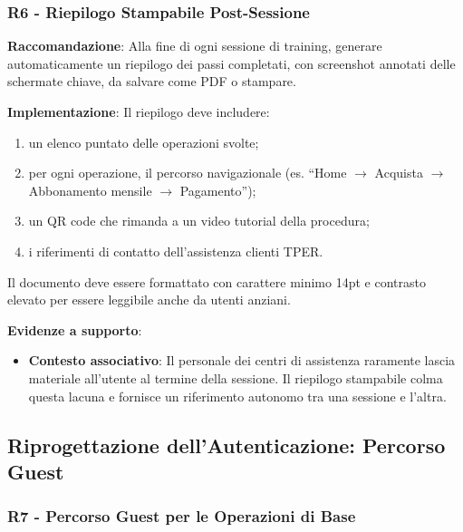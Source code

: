 \documentclass[11pt,a4paper]{article}
\begin{document}
\subsubsection{R6 - Riepilogo Stampabile Post-Sessione}
\label{rec:R6}

\textbf{Raccomandazione}: Alla fine di ogni sessione di training, generare
automaticamente un riepilogo dei passi completati, con screenshot annotati
delle schermate chiave, da salvare come PDF o stampare.

\textbf{Implementazione}: Il riepilogo deve includere:
\begin{enumerate}
    \item un elenco puntato delle operazioni svolte;
    \item per ogni operazione, il percorso navigazionale (es.
    “Home $\rightarrow$ Acquista $\rightarrow$ Abbonamento mensile $\rightarrow$ Pagamento”);
    \item un QR code che rimanda a un video tutorial della procedura;
    \item i riferimenti di contatto dell'assistenza clienti TPER.
\end{enumerate}
Il documento deve essere formattato con carattere minimo 14pt e contrasto
elevato per essere leggibile anche da utenti anziani.

\textbf{Evidenze a supporto}:
\begin{itemize}
    \item \textbf{Contesto associativo}: Il personale dei centri di
    assistenza raramente lascia materiale all'utente al termine della
    sessione. Il riepilogo stampabile colma questa lacuna e fornisce un
    riferimento autonomo tra una sessione e l'altra.
\end{itemize}



\subsection{Riprogettazione dell'Autenticazione: Percorso Guest}

\subsubsection{R7 - Percorso Guest per le Operazioni di Base}
\label{rec:R7}
\end{document}
